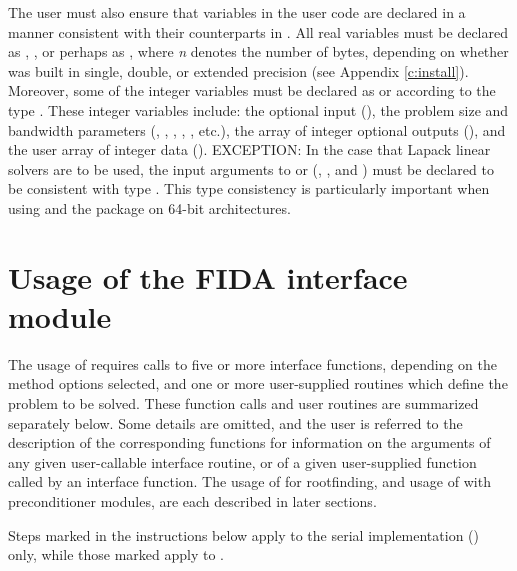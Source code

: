 The user must also ensure that variables in the user {\F} code are
declared in a manner consistent with their counterparts in {\ida}.
All real variables must be declared as , ,
or perhaps as , where {\em n} denotes the number of bytes,
depending on whether {\ida} was built in single, double, or extended precision 
(see Appendix \ref{c:install}). Moreover, some of the {\F} integer variables
must be declared as  or  according to the 
{\C} type . These integer variables include:
the optional input (), the problem size and bandwidth parameters
(, , , , , etc.),
the array of integer optional outputs (),
and the user array of integer data ().
EXCEPTION: In the case that Lapack linear solvers are to be used, the
input arguments to  or  (,
, and ) must be declared to be consistent with {\C} type .
This type consistency is particularly important when using {\ida} and the
{\fida} package on 64-bit architectures.

\section{Usage of the FIDA interface module}\label{ss:fida_usage}

The usage of {\fida} requires calls to five or more interface
functions, depending on the method options selected, and one or more
user-supplied routines which define the problem to be solved.  These
function calls and user routines are summarized separately below.
Some details are omitted, and the user is referred to the description
of the corresponding {\ida} functions for information on the arguments 
of any given user-callable interface routine, or of a given user-supplied 
function called by an interface function.
The usage of {\fida} for rootfinding, and usage of {\fida} with
preconditioner modules, are each described in later sections.

Steps marked {\s} in the instructions below apply to the serial
{\nvector} implementation ({\nvecs}) only, while those marked {\p}
apply to {\nvecp}.

